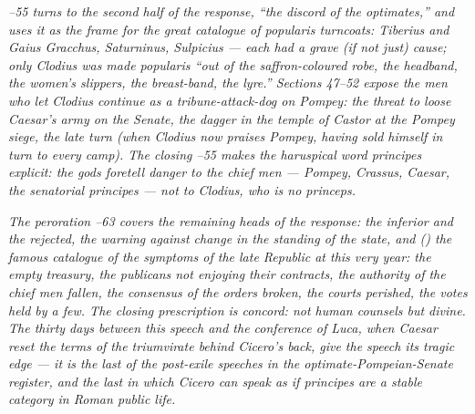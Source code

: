 \textit{--55 turns to the second half of
the response, ``the discord of the optimates,'' and uses
it as the frame for the great catalogue of popularis
turncoats: Tiberius and Gaius Gracchus, Saturninus,
Sulpicius --- each had a grave (if not just) cause; only
Clodius was made popularis ``out of the saffron-coloured
robe, the headband, the women's slippers, the breast-band,
the lyre.'' Sections 47--52 expose the men who let
Clodius continue as a tribune-attack-dog on Pompey: the
threat to loose Caesar's army on the Senate, the dagger
in the temple of Castor at the Pompey siege, the late
turn (when Clodius now praises Pompey, having sold himself
in turn to every camp). The closing --55
makes the haruspical word \textit{principes} explicit:
the gods foretell danger to the chief men --- Pompey,
Crassus, Caesar, the senatorial \textit{principes} ---
not to Clodius, who is no \textit{princeps}.}

\textit{The peroration --63 covers the
remaining heads of the response: the inferior and the
rejected, the warning against change in the standing
of the state, and () the famous catalogue
of the symptoms of the late Republic at this very year:
the empty treasury, the publicans not enjoying their
contracts, the authority of the chief men fallen, the
consensus of the orders broken, the courts perished, the
votes held by a few. The closing prescription is
concord: not human counsels but divine. The thirty days
between this speech and the conference of Luca, when
Caesar reset the terms of the triumvirate behind Cicero's
back, give the speech its tragic edge --- it is the last
of the post-exile speeches in the optimate-Pompeian-Senate
register, and the last in which Cicero can speak as if
\textit{principes} are a stable category in Roman public
life.}
